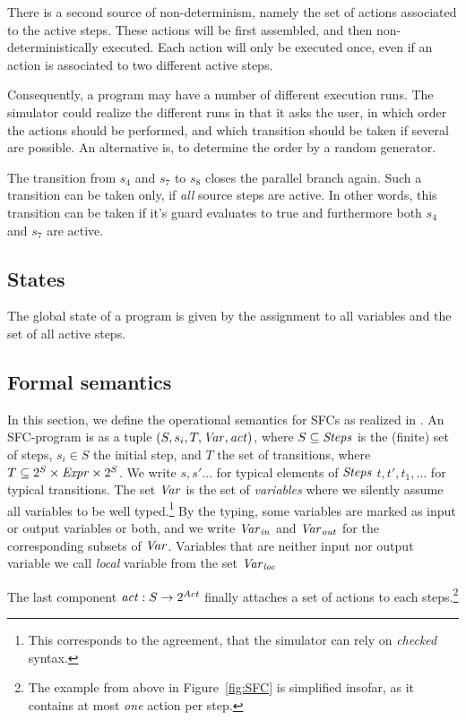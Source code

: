 There is a second source of non-determinism, namely the set of actions
associated to the active steps.  These actions will be first assembled, and
then non-deterministically executed.  Each action will only be executed once,
even if an action is associated to two different active steps.

Consequently, a program may have a number of different execution runs.  The
simulator could realize the different runs in that it asks the user, in which
order the actions should be performed, and which transition should be taken if
several are possible.  An alternative is, to determine the order by a random
generator.

The transition from $s_4$ and $s_7$ to $s_8$ closes the parallel branch again.
Such a transition can be taken only, if \emph{all} source steps are active. In
other words, this transition can be taken if it's guard evaluates to true and
furthermore both $s_4$ and $s_7$ are active.



\subsection{States}
\label{sec:states}

The global state of a program is given by the assignment to all variables and
the set of all active steps.


\subsection{Formal semantics}

In this section, we define the operational semantics for SFCs as realized
in \Slime. An SFC-program is as a tuple $(S,s_i,T,\mathit{Var},\mathit{act})$, where $S
\subseteq \mathit{Steps}$ is the (finite) set of steps, $s_i \in S$ the initial
step, and $T$ the set of transitions, where $T \subseteq 2^S \times \mathit{Expr}
\times 2^S$. We write $s, s' \ldots$ for typical elements of $\mathit{Steps}$
$t,t', t_1, \ldots$ for typical transitions. The set $\mathit{Var}$ is the set of
\emph{variables} where we silently assume all variables to be well
typed.\footnote{This corresponds to the agreement, that the simulator can
  rely on \emph{checked} syntax.} By the typing, some variables are marked
as input or output variables or both, and we write $\mathit{Var}_{\mathit{in}}$ and $\mathit{Var}_{\mathit{out}}$
for the corresponding subsets of $\mathit{Var}$. Variables that are neither input
nor output variable we call \emph{local} variable from the set $\mathit{Var}_{\mathit{loc}}$


 The last component $\mathit{act} \mathrel{:} S \to
2^{\mathit{Act}}$ finally attaches a set of actions to each steps.\footnote{The
  example from above in Figure~\ref{fig:SFC} is simplified insofar, as it
  contains at most \emph{one} action per step.}


